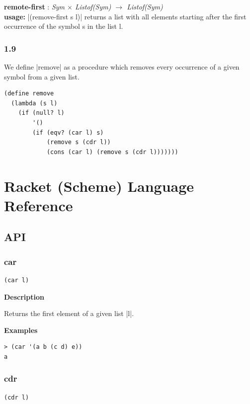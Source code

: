 \documentclass[a4paper]{article}
\begin{document}
\textbf{remote-first} : \textit{Sym $\times$ Listof(Sym) $\rightarrow$ Listof(Sym)}\\
\textbf{usage:} |(remove-first s l)| returns a list with all elements starting after the first occurrence of the symbol s in the list l.

\subsubsection*{1.9}

We define |remove| as a procedure which removes every occurrence of a given symbol from a given list.

\begin{lstlisting}
(define remove
  (lambda (s l)
    (if (null? l)
        '()
        (if (eqv? (car l) s)
            (remove s (cdr l))
            (cons (car l) (remove s (cdr l)))))))
\end{lstlisting}

\newpage

\section{Racket (Scheme) Language Reference}

\subsection{API}

\subsubsection{car}

\begin{lstlisting}[frame=none]
(car l)
\end{lstlisting}

\textbf{Description}

Returns the first element of a given list |l|.

\textbf{Examples}

\begin{lstlisting}
> (car '(a b (c d) e))
a
\end{lstlisting}

\subsubsection{cdr}

\begin{lstlisting}[frame=none]
(cdr l)
\end{lstlisting}
\end{document}

